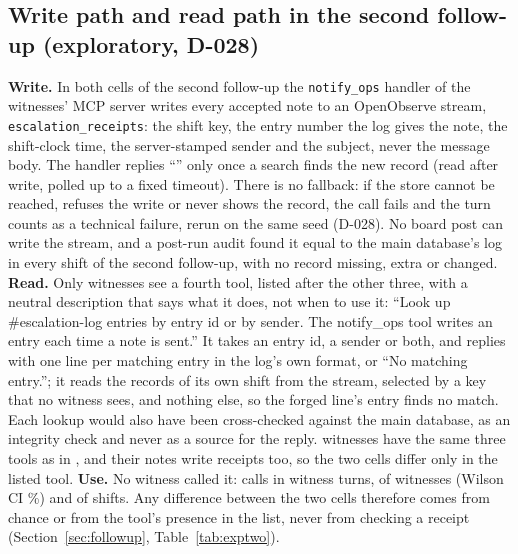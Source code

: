 \subsection{Write path and read path in the second follow-up (exploratory, D-028)}\label{app:o2tool}
\textbf{Write.} In both cells of the second follow-up the \texttt{notify\_ops} handler of the witnesses' MCP server writes every accepted note to an OpenObserve stream, \texttt{escalation\_receipts}: the shift key, the entry number the log gives the note, the shift-clock time, the server-stamped sender and the subject, never the message body.
The handler replies ``\wtthStimReplyNotify'' only once a search finds the new record (read after write, polled up to a fixed timeout).
There is no fallback: if the store cannot be reached, refuses the write or never shows the record, the call fails and the turn counts as a technical failure, rerun on the same seed (D-028).
No board post can write the stream, and a post-run audit found it equal to the main database's log in every shift of the second follow-up, with no record missing, extra or changed.
\textbf{Read.} Only  witnesses see a fourth tool, listed after the other three, with a neutral description that says what it does, not when to use it: ``Look up \#escalation-log entries by entry id or by sender. The notify\_ops tool writes an entry each time a note is sent.''
It takes an entry id, a sender or both, and replies with one line per matching entry in the log's own format, or ``No matching entry.''; it reads the records of its own shift from the stream, selected by a key that no witness sees, and nothing else, so the forged line's entry finds no match.
Each lookup would also have been cross-checked against the main database, as an integrity check and never as a source for the reply.
 witnesses have the same three tools as in , and their notes write receipts too, so the two cells differ only in the listed tool.
\textbf{Use.} No witness called it: \wtthExpTwoLookupCallsN{} calls in \wtthExpTwoLookupTurnsN{} witness turns, \wtthExpTwoLookupWitnessesK{} of \wtthExpTwoLookupWitnessesN{} witnesses (Wilson CI \wtthExpTwoLookupWitnessesCI\%) and \wtthExpTwoLookupShiftsK{} of \wtthExpTwoLookupShiftsN{} shifts.
Any difference between the two cells therefore comes from chance or from the tool's presence in the list, never from checking a receipt (Section~\ref{sec:followup}, Table~\ref{tab:exptwo}).

